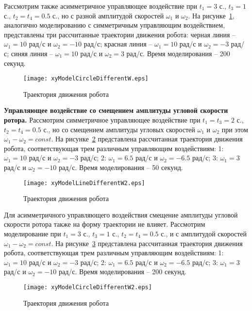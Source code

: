 Рассмотрим также асимметричное управляющее воздействие при $t_1=3$ с., $t_3=1$ с., $t_2=t_4 = 0.5$ с., но с разной амплитудой скоростей $\omega_1$ и $\omega_2$. На рисунке~\ref{xyModelCircleDifferentW}, аналогично моделированию с симметричным управляющим воздействием, представлены три рассчитанные траектории движения робота: черная линия -- $\omega_1=10$ рад/с и $\omega_2=-10$ рад/с; красная линия -- $\omega_1=10$ рад/с и $\omega_2=-3$ рад/с; синяя линия -- $\omega_1=10$ рад/с и $\omega_2=3$ рад/с. Время моделирования -- 200 секунд.

\begin{figure}[!ht]
	\centering
	\texttt{[image: xyModelCircleDifferentW.eps]}
	\caption{Траектория движения робота}
	\label{xyModelCircleDifferentW}
\end{figure}

\textbf{Управляющее воздействие со смещением амплитуды угловой скорости ротора.} Рассмотрим симметричное управляющее воздействие при $t_1=t_3=2$ с., $t_2=t_4 = 0.5$ с., но со смещением амплитуды угловых скоростей $\omega_1$ и $\omega_2$ при этом $\omega_1 - \omega_2 = const$.  На рисунке~\ref{xyModelLineDifferentW2} представлена рассчитанная траектория движения робота, соответствующая трем различным управляющим воздействиям: 1: $\omega_1=10$ рад/с и $\omega_2=-3$ рад/с; 2: $\omega_1=6.5$ рад/с и $\omega_2=-6.5$ рад/с; 3: $\omega_1=3$ рад/с и $\omega_2=-10$ рад/с. Время моделирования -- 50 секунд.

\begin{figure}[!ht]
	\centering
	\texttt{[image: xyModelLineDifferentW2.eps]}
	\caption{Траектория движения робота}
	\label{xyModelLineDifferentW2}
\end{figure}

Для асимметричного управляющего воздействия смещение амплитуды угловой скорости ротора также на форму траектории не влияет. Рассмотрим моделирование при $t_1=3$ с., $t_3=1$ с., $t_2=t_4 = 0.5$ с., и с амплитудой скоростей $\omega_1 - \omega_2 = const$. На рисунке~\ref{xyModelCircleDifferentW2} представлена рассчитанная траектория движения робота, соответствующая трем различным управляющим воздействиям: 1: $\omega_1=10$ рад/с и $\omega_2=-3$ рад/с; 2: $\omega_1=6.5$ рад/с и $\omega_2=-6.5$ рад/с; 3: $\omega_1=3$ рад/с и $\omega_2=-10$ рад/с. Время моделирования -- 200 секунд.

\begin{figure}[!ht]
	\centering
	\texttt{[image: xyModelCircleDifferentW2.eps]}
	\caption{Траектория движения робота}
	\label{xyModelCircleDifferentW2}
\end{figure}

